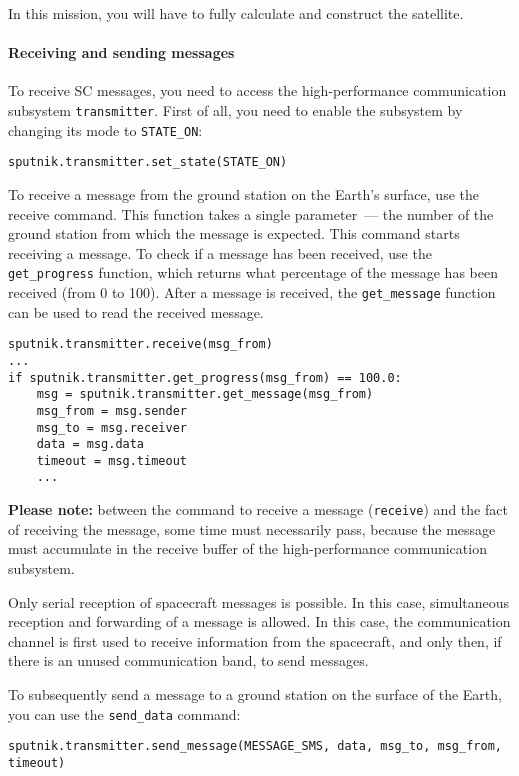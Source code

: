 \documentclass[12pt,a4paper]{article}
\begin{document}
In this mission, you will have to fully calculate and construct the satellite.

\paragraph{Receiving and sending messages}

To receive SC messages, you need to access the high-performance communication subsystem \verb'transmitter'. First of all, you need to enable the subsystem by changing its mode to
\verb'STATE_ON':

\begin{verbatim}
sputnik.transmitter.set_state(STATE_ON)
\end{verbatim}

To receive a message from the ground station on the Earth's surface, use the receive command. This function takes a single parameter~--- the number of the ground station from which the message is expected. This command starts receiving a message. To check if a message has been received, use the \verb'get_progress' function, which returns what percentage of the message has been received (from 0 to 100). After a message is received, the \verb'get_message' function can be used to read the received message.

\begin{verbatim}
sputnik.transmitter.receive(msg_from)
...
if sputnik.transmitter.get_progress(msg_from) == 100.0:
    msg = sputnik.transmitter.get_message(msg_from)
    msg_from = msg.sender
    msg_to = msg.receiver
    data = msg.data
    timeout = msg.timeout
    ...
\end{verbatim}

\textbf{Please note:} between the command to receive a message (\verb'receive') and the fact of receiving the message, some time must necessarily pass, because the message must accumulate in the receive buffer of the high-performance communication subsystem.

Only serial reception of spacecraft messages is possible. In this case, simultaneous reception and forwarding of a message is allowed. In this case, the communication channel is first used to receive information from the spacecraft, and only then, if there is an unused communication band, to send messages.

To subsequently send a message to a ground station on the surface of the Earth, you can use the \verb'send_data' command:

\begin{verbatim}
sputnik.transmitter.send_message(MESSAGE_SMS, data, msg_to, msg_from, timeout)
\end{verbatim}
\end{document}
